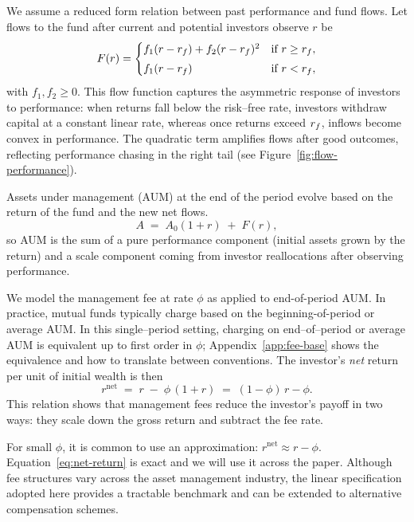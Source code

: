 We assume a reduced form relation between past performance and fund flows. Let flows to the fund after current and potential investors observe \(r\) be
\begin{align}
    \label{eq:flow}
    F(r) = \begin{cases}
      f_1 (r-r_f) + f_2 (r-r_f)^2 & \text{if } r \ge r_f,\\[3pt]
      f_1 (r-r_f) & \text{if } r< r_f,
   \end{cases}
\end{align}
with \(f_1,f_2\ge 0\). This flow function captures the asymmetric response of investors to performance: when returns fall below the risk--free rate, investors withdraw capital at a constant linear rate, whereas once returns exceed $r_f$, inflows become convex in performance. The quadratic term amplifies flows after good outcomes, reflecting performance chasing in the right tail (see Figure~\ref{fig:flow-performance}).

Assets under management (AUM) at the end of the period evolve based on the return of the fund and the new net flows.
\begin{equation}
    A \;=\; A_0(1+r)\;+\;F(r),
\end{equation}
so AUM is the sum of a pure performance component (initial assets grown by the return) and a scale component coming from investor reallocations after observing performance.

We model the management fee at rate \(\phi\) as applied to end-of-period AUM. In practice, mutual funds typically charge based on the beginning-of-period or average AUM. In this single--period setting, charging on end--of--period or average AUM is equivalent up to first order in \(\phi\); Appendix~\ref{app:fee-base} shows the equivalence and how to translate between conventions. The investor's \emph{net} return per unit of initial wealth is then
\begin{equation}
\label{eq:net-return}
r^{\text{net}} \;=\; r \;-\; \phi\,(1+r) \;=\; (1-\phi)\,r - \phi.
\end{equation}
This relation shows that management fees reduce the investor's payoff in two ways: they scale down the gross return and subtract the fee rate.

For small \(\phi\), it is common to use an approximation: \(r^{\text{net}}\approx r-\phi\). Equation~\eqref{eq:net-return} is exact and we will use it across the paper. Although fee structures vary across the asset management industry, the linear specification adopted here provides a tractable benchmark and can be extended to alternative compensation schemes.

